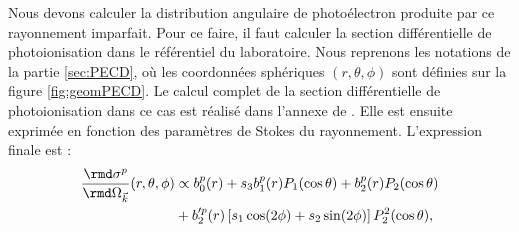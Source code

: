 Nous devons calculer la distribution angulaire de photoélectron produite par ce rayonnement imparfait. Pour ce faire, il faut calculer la section différentielle de photoionisation dans le référentiel du laboratoire. Nous reprenons les notations de la partie \ref{sec:PECD}, où les coordonnées sphériques $(r,\theta,\phi)$ sont définies sur la figure \ref{fig:geomPECD}. Le calcul complet de la section différentielle de photoionisation dans ce cas est réalisé dans l'annexe de . Elle est ensuite exprimée en fonction des paramètres de Stokes du rayonnement. L'expression finale est :
\begin{align}
\frac{\rmd\sigma^p}{\rmd\Omega_{\vec{k}}}(r,\theta,\phi) &\propto b_0^p(r)+s_3b_1^p(r)P_1(\cos\theta)+b_2^p(r)P_2(\cos\theta)\\
&+b_2'^p(r)\left[s_1\cos(2\phi)+s_2\sin(2\phi)\right]P_2^2(\cos\theta),
\label{eq:sigma_ell}
\end{align}

